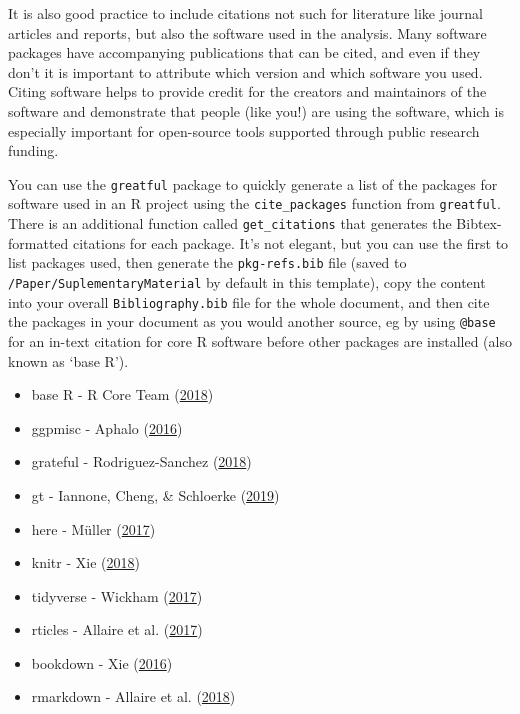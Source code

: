 \documentclass[]{elsarticle} %
\providecommand{\tightlist}{%
  \setlength{\itemsep}{0pt}\setlength{\parskip}{0pt}}
\begin{document}
It is also good practice to include citations not such for literature
like journal articles and reports, but also the software used in the
analysis. Many software packages have accompanying publications that can
be cited, and even if they don't it is important to attribute which
version and which software you used. Citing software helps to provide
credit for the creators and maintainors of the software and demonstrate
that people (like you!) are using the software, which is especially
important for open-source tools supported through public research
funding.

You can use the \texttt{greatful} package to quickly generate a list of
the packages for software used in an R project using the
\texttt{cite\_packages} function from \texttt{greatful}. There is an
additional function called \texttt{get\_citations} that generates the
Bibtex-formatted citations for each package. It's not elegant, but you
can use the first to list packages used, then generate the
\texttt{pkg-refs.bib} file (saved to
\texttt{/Paper/SuplementaryMaterial} by default in this template), copy
the content into your overall \texttt{Bibliography.bib} file for the
whole document, and then cite the packages in your document as you would
another source, eg by using \texttt{@base} for an in-text citation for
core R software before other packages are installed (also known as `base
R').

\begin{itemize}
\tightlist
\item
  base R - R Core Team (\protect\hyperlink{ref-base}{2018})
\item
  ggpmisc - Aphalo (\protect\hyperlink{ref-ggpmisc}{2016})
\item
  grateful - Rodriguez-Sanchez (\protect\hyperlink{ref-grateful}{2018})
\item
  gt - Iannone, Cheng, \& Schloerke (\protect\hyperlink{ref-gt}{2019})
\item
  here - Müller (\protect\hyperlink{ref-here}{2017})
\item
  knitr - Xie (\protect\hyperlink{ref-knitr}{2018})
\item
  tidyverse - Wickham (\protect\hyperlink{ref-tidyverse}{2017})
\item
  rticles - Allaire et al. (\protect\hyperlink{ref-rticles}{2017})
\item
  bookdown - Xie (\protect\hyperlink{ref-bookdown}{2016})
\item
  rmarkdown - Allaire et al. (\protect\hyperlink{ref-rmarkdown}{2018})
\end{itemize}
\end{document}
